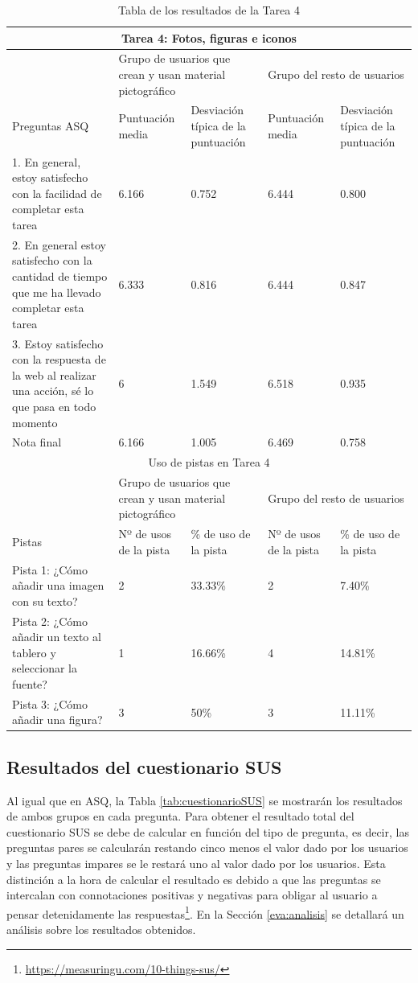 \begin{table}

\begin{tabular}{ |p{4cm}|p{2cm}|p{2cm}|p{2cm}|p{2cm}|  }
	\hline
	\multicolumn{5}{|c|}{Tarea 4: Fotos, figuras e iconos} \\
	\hline
	& \multicolumn{2}{p{4cm}|}{Grupo de usuarios que crean y usan material pictográfico} & \multicolumn{2}{p{4cm}|}{Grupo del resto de usuarios }  \\ 
	\hline
	Preguntas ASQ & Puntuación media  &Desviación típica de la puntuación & Puntuación media & Desviación típica de la puntuación\\
	\hline
	1. En general, estoy satisfecho con la facilidad de completar esta tarea &6.166  &0.752 &6.444  &0.800\\
	\hline
	2. En general estoy satisfecho con la cantidad de tiempo que me ha llevado completar esta tarea &6.333  &0.816  &6.444 &0.847\\
	\hline
	3. Estoy satisfecho con la respuesta de la web al realizar una acción, sé lo que pasa en todo momento &6 &1.549 &6.518   &0.935\\
	\hline
	Nota final &6.166 &1.005 &6.469  &0.758\\
	\hline
	\multicolumn{5}{|c|}{Uso de pistas en Tarea 4} \\
	\hline
	& \multicolumn{2}{p{4cm}|}{Grupo de usuarios que crean y usan material pictográfico} & \multicolumn{2}{p{4cm}|}{Grupo del resto de usuarios }  \\ 
	\hline
	Pistas &Nº de usos de la pista &\% de uso de la pista&Nº de usos de la pista&\% de uso de la pista\\
	\hline
	Pista 1: ¿Cómo añadir una imagen con su texto? &2  &33.33\% &2 &7.40\%\\
	\hline
	Pista 2: ¿Cómo añadir un texto al tablero y seleccionar la fuente? &1 &16.66\%  &4 &14.81\%\\
	\hline
	Pista 3: ¿Cómo añadir una figura? &3 &50\% &3   &11.11\% \\
	\hline
\end{tabular}
\caption{\label{tab:area4respuestas}Tabla de los resultados de la Tarea 4}
\end{table}

\subsection{Resultados del cuestionario SUS}
Al igual que en ASQ,  la Tabla \ref{tab:cuestionarioSUS} se mostrarán los resultados de ambos grupos en cada pregunta. Para obtener el resultado total del cuestionario SUS se debe de calcular en función del tipo de pregunta, es decir, las preguntas pares se calcularán restando cinco menos el valor dado por los usuarios y las preguntas impares se le restará uno al valor dado por los usuarios.  Esta distinción a la hora de calcular el resultado es debido a que las preguntas se intercalan con connotaciones positivas y negativas para obligar al usuario a pensar detenidamente las respuestas\footnote{\url{https://measuringu.com/10-things-sus/}}. En la Sección \ref{eva:analisis} se detallará un análisis sobre los resultados obtenidos. 



